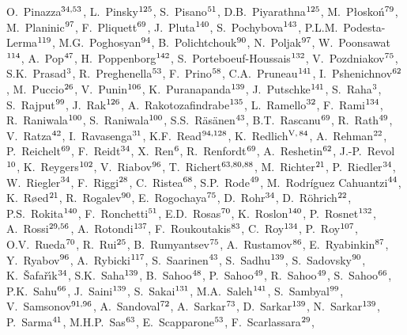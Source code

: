 \begin{flushleft}
O.~Pinazza$^{\rm 34,53}$, 
L.~Pinsky$^{\rm 125}$, 
S.~Pisano$^{\rm 51}$, 
D.B.~Piyarathna$^{\rm 125}$, 
M.~P\l osko\'{n}$^{\rm 79}$, 
M.~Planinic$^{\rm 97}$, 
F.~Pliquett$^{\rm 69}$, 
J.~Pluta$^{\rm 140}$, 
S.~Pochybova$^{\rm 143}$, 
P.L.M.~Podesta-Lerma$^{\rm 119}$, 
M.G.~Poghosyan$^{\rm 94}$, 
B.~Polichtchouk$^{\rm 90}$, 
N.~Poljak$^{\rm 97}$, 
W.~Poonsawat$^{\rm 114}$, 
A.~Pop$^{\rm 47}$, 
H.~Poppenborg$^{\rm 142}$, 
S.~Porteboeuf-Houssais$^{\rm 132}$, 
V.~Pozdniakov$^{\rm 75}$, 
S.K.~Prasad$^{\rm 3}$, 
R.~Preghenella$^{\rm 53}$, 
F.~Prino$^{\rm 58}$, 
C.A.~Pruneau$^{\rm 141}$, 
I.~Pshenichnov$^{\rm 62}$, 
M.~Puccio$^{\rm 26}$, 
V.~Punin$^{\rm 106}$, 
K.~Puranapanda$^{\rm 139}$, 
J.~Putschke$^{\rm 141}$, 
S.~Raha$^{\rm 3}$, 
S.~Rajput$^{\rm 99}$, 
J.~Rak$^{\rm 126}$, 
A.~Rakotozafindrabe$^{\rm 135}$, 
L.~Ramello$^{\rm 32}$, 
F.~Rami$^{\rm 134}$, 
R.~Raniwala$^{\rm 100}$, 
S.~Raniwala$^{\rm 100}$, 
S.S.~R\"{a}s\"{a}nen$^{\rm 43}$, 
B.T.~Rascanu$^{\rm 69}$, 
R.~Rath$^{\rm 49}$, 
V.~Ratza$^{\rm 42}$, 
I.~Ravasenga$^{\rm 31}$, 
K.F.~Read$^{\rm 94,128}$, 
K.~Redlich$^{\rm V,}$$^{\rm 84}$, 
A.~Rehman$^{\rm 22}$, 
P.~Reichelt$^{\rm 69}$, 
F.~Reidt$^{\rm 34}$, 
X.~Ren$^{\rm 6}$, 
R.~Renfordt$^{\rm 69}$, 
A.~Reshetin$^{\rm 62}$, 
J.-P.~Revol$^{\rm 10}$, 
K.~Reygers$^{\rm 102}$, 
V.~Riabov$^{\rm 96}$, 
T.~Richert$^{\rm 63,80,88}$, 
M.~Richter$^{\rm 21}$, 
P.~Riedler$^{\rm 34}$, 
W.~Riegler$^{\rm 34}$, 
F.~Riggi$^{\rm 28}$, 
C.~Ristea$^{\rm 68}$, 
S.P.~Rode$^{\rm 49}$, 
M.~Rodr\'{i}guez Cahuantzi$^{\rm 44}$, 
K.~R{\o}ed$^{\rm 21}$, 
R.~Rogalev$^{\rm 90}$, 
E.~Rogochaya$^{\rm 75}$, 
D.~Rohr$^{\rm 34}$, 
D.~R\"ohrich$^{\rm 22}$, 
P.S.~Rokita$^{\rm 140}$, 
F.~Ronchetti$^{\rm 51}$, 
E.D.~Rosas$^{\rm 70}$, 
K.~Roslon$^{\rm 140}$, 
P.~Rosnet$^{\rm 132}$, 
A.~Rossi$^{\rm 29,56}$, 
A.~Rotondi$^{\rm 137}$, 
F.~Roukoutakis$^{\rm 83}$, 
C.~Roy$^{\rm 134}$, 
P.~Roy$^{\rm 107}$, 
O.V.~Rueda$^{\rm 70}$, 
R.~Rui$^{\rm 25}$, 
B.~Rumyantsev$^{\rm 75}$, 
A.~Rustamov$^{\rm 86}$, 
E.~Ryabinkin$^{\rm 87}$, 
Y.~Ryabov$^{\rm 96}$, 
A.~Rybicki$^{\rm 117}$, 
S.~Saarinen$^{\rm 43}$, 
S.~Sadhu$^{\rm 139}$, 
S.~Sadovsky$^{\rm 90}$, 
K.~\v{S}afa\v{r}\'{\i}k$^{\rm 34}$, 
S.K.~Saha$^{\rm 139}$, 
B.~Sahoo$^{\rm 48}$, 
P.~Sahoo$^{\rm 49}$, 
R.~Sahoo$^{\rm 49}$, 
S.~Sahoo$^{\rm 66}$, 
P.K.~Sahu$^{\rm 66}$, 
J.~Saini$^{\rm 139}$, 
S.~Sakai$^{\rm 131}$, 
M.A.~Saleh$^{\rm 141}$, 
S.~Sambyal$^{\rm 99}$, 
V.~Samsonov$^{\rm 91,96}$, 
A.~Sandoval$^{\rm 72}$, 
A.~Sarkar$^{\rm 73}$, 
D.~Sarkar$^{\rm 139}$, 
N.~Sarkar$^{\rm 139}$, 
P.~Sarma$^{\rm 41}$, 
M.H.P.~Sas$^{\rm 63}$, 
E.~Scapparone$^{\rm 53}$, 
F.~Scarlassara$^{\rm 29}$, 
$$
\end{flushleft}
